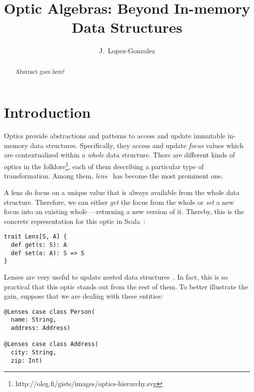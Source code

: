 \documentclass[final, twocolumn, 3p]{elsarticle}
\begin{document}
\begin{frontmatter}

\title{Optic Algebras: Beyond In-memory Data Structures}

\author[rvt]{J.~Lopez-Gonzalez}


\begin{abstract}
Abstract goes here!
\end{abstract}

\end{frontmatter}

\lstset{language=Scala}

\section{Introduction}

Optics provide abstractions and patterns to access and update immutable
in-memory data structures. Specifically, they access and update \emph{focus}
values which are contextualized within a \emph{whole} data structure. There are
different kinds of optics in the
folklore\footnote{http://oleg.fi/gists/images/optics-hierarchy.svg}, each of
them describing a particular type of transformation. Among them,
\emph{lens}~\cite{foster2005combinators} has become the most prominent one.

A lens do focus on a unique value that is always available from the whole data
structure. Therefore, we can either \emph{get} the focus from the whole or
\emph{set} a new focus into an existing whole ---returning a new version of it.
Thereby, this is the concrete representation for this optic in
Scala~\cite{odersky2004overview}:

\begin{lstlisting}
trait Lens[S, A] {
  def get(s: S): A
  def set(a: A): S => S
}
\end{lstlisting}

Lenses are very useful to update nested data
structures~\cite{morris2012asymmetric}. In fact, this is so practical that this
optic stands out from the rest of them. To better illustrate the gain, suppose
that we are dealing with these entities:

\begin{lstlisting}
@Lenses case class Person(
  name: String,
  address: Address)

@Lenses case class Address(
  city: String,
  zip: Int)
\end{lstlisting}
\end{document}
